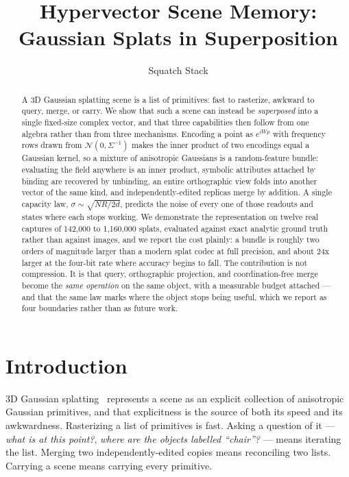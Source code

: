 \documentclass[11pt]{article}
\title{Hypervector Scene Memory:\\Gaussian Splats in Superposition}
\author{Squatch Stack}
\date{}
\begin{document}
\maketitle
\begin{abstract}
A 3D Gaussian splatting scene is a list of primitives: fast to
rasterize, awkward to query, merge, or carry. We show that such a scene
can instead be \emph{superposed} into a single fixed-size complex
vector, and that three capabilities then follow from one algebra rather
than from three mechanisms. Encoding a point as $e^{iWp}$ with frequency
rows drawn from $\mathcal{N}(0, \Sigma^{-1})$ makes the inner product of
two encodings equal a Gaussian kernel, so a mixture of anisotropic
Gaussians is a random-feature bundle: evaluating the field anywhere is
an inner product, symbolic attributes attached by binding are recovered
by unbinding, an entire orthographic view folds into another vector of
the same kind, and independently-edited replicas merge by addition. A
single capacity law, $\sigma \sim \sqrt{N R / 2d}$, predicts the noise
of every one of those readouts and states where each stops working. We
demonstrate the representation on twelve real captures of 142,000 to
1,160,000 splats, evaluated against exact analytic ground truth rather
than against images, and we report the cost plainly: a bundle is roughly
two orders of magnitude larger than a modern splat codec at full
precision, and about 24x larger at the four-bit rate where accuracy
begins to fall. The contribution is not compression. It is that query,
orthographic projection, and coordination-free merge become the
\emph{same operation} on the same object, with a measurable budget
attached --- and that the same law marks where the object stops being
useful, which we report as four boundaries rather than as future work.
\end{abstract}

\section{Introduction}

3D Gaussian splatting~\cite{kerbl20233dgs} represents a scene as an
explicit collection of anisotropic Gaussian primitives, and that
explicitness is the source of both its speed and its awkwardness.
Rasterizing a list of primitives is fast. Asking a question of it ---
\emph{what is at this point?}, \emph{where are the objects labelled
``chair''?} --- means iterating the list. Merging two
independently-edited copies means reconciling two lists. Carrying a
scene means carrying every primitive.
\end{document}
